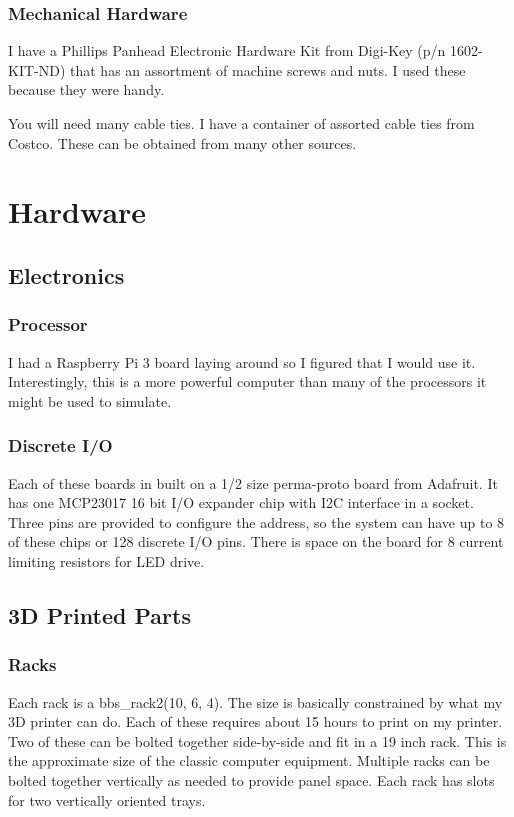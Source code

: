 \documentclass[10pt, openany]{book}
\begin{document}
\subsection{Mechanical Hardware}
I have a Phillips Panhead Electronic Hardware Kit from Digi-Key (p/n 1602-KIT-ND) that has an assortment of machine screws and nuts.  I used these because they were handy.

You will need many cable ties.  I have a container of assorted cable ties from Costco.  These can be obtained from many other sources.

\chapter{Hardware}

\section{Electronics}
\subsection{Processor}
I had a Raspberry Pi 3 board laying around so I figured that I would use it.  Interestingly, this is a more powerful computer than many of the processors it might be used to simulate.

\subsection{Discrete I/O}
Each of these boards in built on a 1/2 size perma-proto board from Adafruit.  It has one MCP23017 16 bit I/O expander chip with I2C interface in a socket.  Three pins are provided to configure the address, so the system can have up to 8 of these chips or 128 discrete I/O pins.  There is space on the board for 8 current limiting resistors for LED drive.

\section{3D Printed Parts}
\subsection{Racks}
Each rack is a bbs\_rack2(10, 6, 4).  The size is basically constrained by what my 3D printer can do.  Each of these requires about 15 hours to print on my printer.  Two of these can be bolted together side-by-side and fit in a 19 inch rack.  This is the approximate size of the classic computer equipment.  Multiple racks can be bolted together vertically as needed to provide panel space.  Each rack has slots for two vertically oriented trays.
\end{document}
